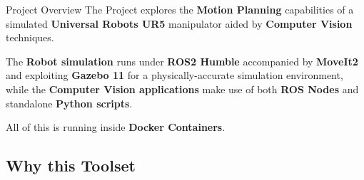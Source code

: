 \begin{frame}{Project Overview}
    The Project explores the \textbf{Motion Planning} capabilities of a simulated \textbf{Universal Robots UR5} manipulator aided by \textbf{Computer Vision} techniques.

    The \textbf{Robot simulation} runs under \textbf{ROS2 Humble} accompanied by \textbf{MoveIt2} and exploiting \textbf{Gazebo 11} for a physically-accurate simulation environment, while the \textbf{Computer Vision applications} make use of both \textbf{ROS Nodes} and standalone \textbf{Python scripts}.

    All of this is running inside \textbf{Docker Containers}.
\end{frame}

\subsection{Why this Toolset}
